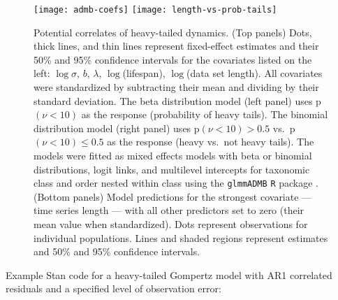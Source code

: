 \clearpage


\begin{figure}[htbp]
\begin{center}
\texttt{[image: admb-coefs]}
\texttt{[image: length-vs-prob-tails]}
\caption{Potential correlates of heavy-tailed dynamics.
  (Top panels) Dots, thick lines, and thin lines represent fixed-effect estimates and their 50\% and 95\% confidence intervals for the covariates listed on the left: $\log \sigma$, $b$, $\lambda$, $\log$(lifespan), $\log$(data set length). All covariates were standardized by subtracting their mean and dividing by their standard deviation.
  The beta distribution model (left panel) uses p$(\nu < 10)$ as the response (probability of heavy tails).
  The binomial distribution model (right panel) uses p$(\nu < 10) > 0.5$ vs.\ p$(\nu < 10) \le 0.5$ as the response (heavy vs.\ not heavy tails).
  The models were fitted as mixed effects models with beta or binomial distributions, logit links, and multilevel intercepts for taxonomic class and order nested within class using the \texttt{glmmADMB} \texttt{R} package \citep{fournier2012,glmmadmb}.
  (Bottom panels) Model predictions for the strongest covariate --- time series length --- with all other predictors set to zero (their mean value when standardized). Dots represent observations for individual populations. Lines and shaded regions represent estimates and 50\% and 95\% confidence intervals.
}
    \label{fig:correlate-coefs}
\end{center}
\end{figure}

%

\clearpage

\noindent
Example Stan code for a heavy-tailed Gompertz model with AR1 correlated residuals and a specified level of observation error:

